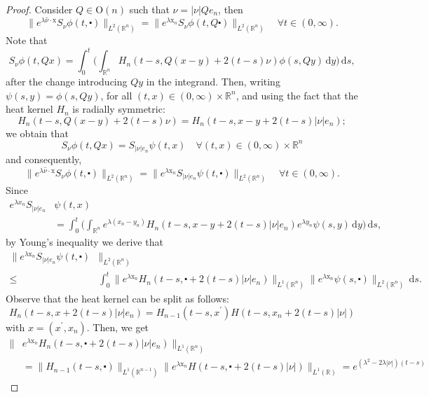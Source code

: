 \documentclass[10pt,a4paper]{amsart}
\newcommand{\R}{\mathbb{R}}
\newcommand{\dd}{\mathrm{d}}
\newcommand{\x}{\mathrm{x}}
\begin{document}
\begin{proof}
Consider $Q \in \mathrm{O}(n)$ such that $ \nu=|\nu| Q e_n $, then
$$
\| e^{\lambda \hat{\nu} \cdot \x} S_\nu \phi (t, \centerdot) \|_{L^2(\R^n)}=\| e^{\lambda  \x_n} S_\nu \phi (t, Q \centerdot) \|_{L^2(\R^n)} \quad \forall t \in (0, \infty).
$$
Note that
\[ S_\nu \phi(t, Qx) = \int_0^t \Big( \int_{\R^n} H_n (t-s, Q (x - y) + 2(t-s) \nu) \phi(s, Qy) \, \dd y \Big) \, \dd s, \]
after the change introducing $Qy$ in the integrand. Then, writing
$\psi(s,y)=\phi(s, Qy)$, for all $(t,x) \in (0, \infty) \times \R^n$, and using the fact that
the heat kernel $H_n$ is radially symmetric:
$$
H_n (t-s, Q (x - y) + 2(t-s) \nu) = H_n (t-s, x - y + 2(t-s) |\nu| e_n);
$$
we obtain that
$$
S_\nu \phi(t, Qx)= S_{|\nu| e_n} \psi(t, x) \quad \forall(t, x) \in (0, \infty) \times \mathbb{R}^n
$$
and consequently,
$$
\| e^{\lambda \hat{\nu} \cdot \x} S_\nu \phi (t, \centerdot) \|_{L^2(\R^n)}=\| e^{\lambda  \x_n} S_{|\nu| e_n} \psi (t, \centerdot) \|_{L^2(\R^n)} \quad \forall t \in (0, \infty).
$$
Since
\begin{align*}
e^{\lambda x_n} S_{|\nu| e_n} & \psi(t, x)\\
& = \int_0^t \Big( \int_{\R^n} e^{\lambda (x_n-y_n)} H_n (t-s, x - y + 2(t-s) |\nu| e_n) e^{\lambda y_n} \psi(s,y) \, \dd y \Big) \, \dd s,
\end{align*}
by Young's inequality we derive that
\begin{align*}
\| e^{\lambda  \x_n} S_{|\nu| e_n} \psi (t, \centerdot) & \|_{L^2(\R^n)} \\
\leq & \int_0^t \| e^{\lambda \x_n} H_n (t-s, \centerdot + 2(t-s) |\nu| e_n)\|_{L^1(\R^n)} \| e^{\lambda \x_n} \psi(s, \centerdot)\|_{L^2(\R^n)} \, \dd s.
\end{align*}
Observe that the heat kernel can be split as follows:
\[H_n (t-s, x + 2(t-s) |\nu| e_n) = H_{n-1} (t-s, x^\prime) H (t-s, x_n + 2(t-s) |\nu|)\]
with $x = (x^\prime, x_n)$.
Then, we get
\begin{align*}
\| & e^{\lambda \x_n} H_n (t-s, \centerdot + 2(t-s) |\nu| e_n)\|_{L^1(\R^n)} \\
& = \|H_{n-1} (t-s, \centerdot)\|_{L^1(\R^{n-1})} \|e^{\lambda \x_n} H (t-s, \centerdot + 2(t-s) |\nu|)\|_{L^1(\R)} = e^{(\lambda^2-2\lambda|\nu|)(t-s)}

\end{align*}
\end{proof}
\end{document}
